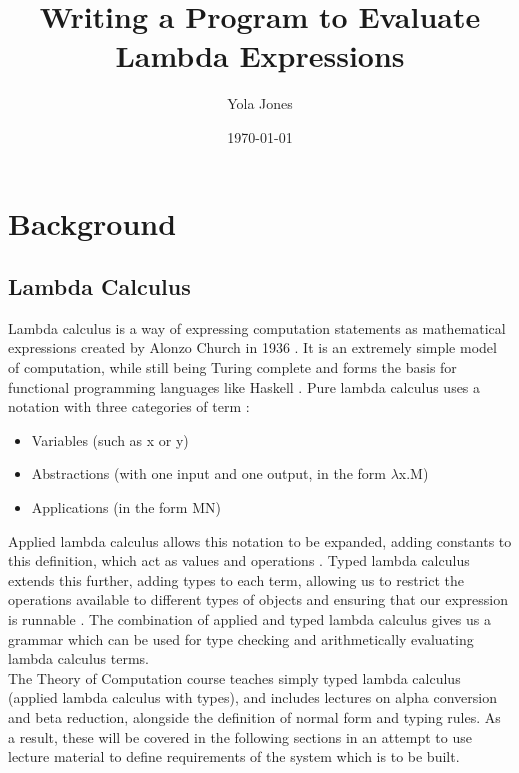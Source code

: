 \documentclass[a4paper,12pt]{report}
\begin{document}
\title{Writing a Program to Evaluate Lambda Expressions}
\author{Yola Jones}
\date{\today}
\maketitle

%
%

\chapter{Background}
\section{Lambda Calculus}

Lambda calculus is a way of expressing computation statements as mathematical expressions \cite{Selinger2013} created by Alonzo Church in 1936 \cite{Barendregt2000}. It is an extremely simple model of computation, while still being Turing complete \cite{Rojas1998} and forms the basis for functional programming languages like Haskell \cite{Barendregt2000}. Pure lambda calculus uses a notation with three categories of term \cite{Hankin2004}:

\begin{itemize}
	\item Variables (such as x or y)
	\item Abstractions (with one input and one output, in the form $\lambda$x.M)
	\item Applications (in the form MN)
\end{itemize}

Applied lambda calculus allows this notation to be expanded, adding constants to this definition, which act as values and operations \cite{Slonneger1995}. Typed lambda calculus extends this further, adding types to each term, allowing us to restrict the operations available to different types of objects and ensuring that our expression is runnable \cite{Loader1998}. The combination of applied and typed lambda calculus gives us a grammar which can be used for type checking and arithmetically evaluating lambda calculus terms.\\

The Theory of Computation course teaches simply typed lambda calculus (applied lambda calculus with types), and includes lectures on alpha conversion and beta reduction, alongside the definition of normal form and typing rules. As a result, these will be covered in the following sections in an attempt to use lecture material to define requirements of the system which is to be built.
\end{document}
